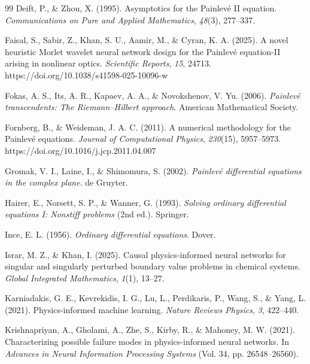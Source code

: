 \documentclass[11pt,a4paper]{article}
\theoremstyle{definition}
\begin{document}
\begin{thebibliography}{99}
Deift, P., \& Zhou, X. (1995). Asymptotics for the {Painlev\'e II} equation. \emph{Communications on Pure and Applied Mathematics}, \emph{48}(3), 277--337.

Faisal, S., Sabir, Z., Khan, S. U., Aamir, M., \& Cyran, K. A. (2025). A novel heuristic {Morlet} wavelet neural network design for the {Painlev\'e} equation-{II} arising in nonlinear optics. \emph{Scientific Reports}, \emph{15}, 24713. https://doi.org/10.1038/s41598-025-10096-w

Fokas, A. S., Its, A. R., Kapaev, A. A., \& Novokshenov, V. Yu. (2006). \emph{{Painlev\'e} transcendents: The {Riemann--Hilbert} approach}. American Mathematical Society.

Fornberg, B., \& Weideman, J. A. C. (2011). A numerical methodology for the {Painlev\'e} equations. \emph{Journal of Computational Physics}, \emph{230}(15), 5957--5973. https://doi.org/10.1016/j.jcp.2011.04.007

Gromak, V. I., Laine, I., \& Shimomura, S. (2002). \emph{{Painlev\'e} differential equations in the complex plane}. de Gruyter.

Hairer, E., Norsett, S. P., \& Wanner, G. (1993). \emph{Solving ordinary differential equations {I}: Nonstiff problems} (2nd ed.). Springer.

Ince, E. L. (1956). \emph{Ordinary differential equations}. Dover.

Israr, M. Z., \& Khan, I. (2025). Causal physics-informed neural networks for singular and singularly perturbed boundary value problems in chemical systems. \emph{Global Integrated Mathematics}, \emph{1}(1), 13--27.

Karniadakis, G. E., Kevrekidis, I. G., Lu, L., Perdikaris, P., Wang, S., \& Yang, L. (2021). Physics-informed machine learning. \emph{Nature Reviews Physics}, \emph{3}, 422--440.

Krishnapriyan, A., Gholami, A., Zhe, S., Kirby, R., \& Mahoney, M. W. (2021). Characterizing possible failure modes in physics-informed neural networks. In \emph{Advances in Neural Information Processing Systems} (Vol. 34, pp. 26548--26560).


\end{thebibliography}
\end{document}
